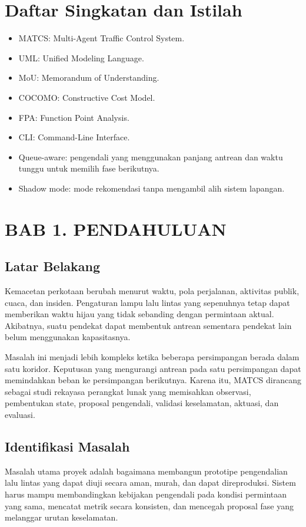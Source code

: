 \documentclass[12pt]{article}
\begin{document}
\newpage
\tableofcontents
\listoffigures
\listoftables

\section*{Daftar Singkatan dan Istilah}
\begin{itemize}[leftmargin=1.2em]
  \item MATCS: Multi-Agent Traffic Control System.
  \item UML: Unified Modeling Language.
  \item MoU: Memorandum of Understanding.
  \item COCOMO: Constructive Cost Model.
  \item FPA: Function Point Analysis.
  \item CLI: Command-Line Interface.
  \item Queue-aware: pengendali yang menggunakan panjang antrean dan waktu tunggu untuk memilih fase berikutnya.
  \item Shadow mode: mode rekomendasi tanpa mengambil alih sistem lapangan.
\end{itemize}

\newpage
\section{BAB 1. PENDAHULUAN}
\subsection{Latar Belakang}
Kemacetan perkotaan berubah menurut waktu, pola perjalanan, aktivitas publik, cuaca, dan insiden. Pengaturan lampu lalu lintas yang sepenuhnya tetap dapat memberikan waktu hijau yang tidak sebanding dengan permintaan aktual. Akibatnya, suatu pendekat dapat membentuk antrean sementara pendekat lain belum menggunakan kapasitasnya.

Masalah ini menjadi lebih kompleks ketika beberapa persimpangan berada dalam satu koridor. Keputusan yang mengurangi antrean pada satu persimpangan dapat memindahkan beban ke persimpangan berikutnya. Karena itu, MATCS dirancang sebagai studi rekayasa perangkat lunak yang memisahkan observasi, pembentukan state, proposal pengendali, validasi keselamatan, aktuasi, dan evaluasi.

\subsection{Identifikasi Masalah}
Masalah utama proyek adalah bagaimana membangun prototipe pengendalian lalu lintas yang dapat diuji secara aman, murah, dan dapat direproduksi. Sistem harus mampu membandingkan kebijakan pengendali pada kondisi permintaan yang sama, mencatat metrik secara konsisten, dan mencegah proposal fase yang melanggar urutan keselamatan.
\end{document}
